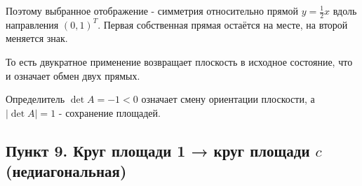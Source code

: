 \documentclass[a4paper,14pt]{extarticle}
\begin{document}
Поэтому выбранное отображение - симметрия относительно прямой
\(y = \tfrac{1}{2}x\) вдоль направления \((0, 1)^T\). Первая собственная
прямая остаётся на месте, на второй меняется знак. \begin{center}\end{center}

То есть двукратное применение возвращает плоскость в исходное состояние,
что и означает обмен двух прямых.

Определитель \(\det A = -1 < 0\) означает смену ориентации плоскости, а
\(|\det A| = 1\) - сохранение площадей.

\hypertarget{ux43fux443ux43dux43aux442-9.-ux43aux440ux443ux433-ux43fux43bux43eux449ux430ux434ux438-1-ux43aux440ux443ux433-ux43fux43bux43eux449ux430ux434ux438-c-ux43dux435ux434ux438ux430ux433ux43eux43dux430ux43bux44cux43dux430ux44f}{%
\subsection{\texorpdfstring{Пункт 9. Круг площади 1 → круг площади \(c\)
(недиагональная)}{Пункт 9. Круг площади 1 → круг площади c (недиагональная)}}\label{ux43fux443ux43dux43aux442-9.-ux43aux440ux443ux433-ux43fux43bux43eux449ux430ux434ux438-1-ux43aux440ux443ux433-ux43fux43bux43eux449ux430ux434ux438-c-ux43dux435ux434ux438ux430ux433ux43eux43dux430ux43bux44cux43dux430ux44f}}
\end{document}
